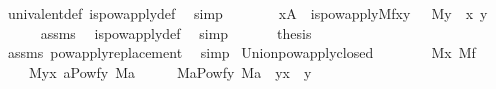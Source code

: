 \begin{isabellebody}
\ univalent{\isacharunderscore}{\kern0pt}def\ is{\isacharunderscore}{\kern0pt}powapply{\isacharunderscore}{\kern0pt}def\ \isamarkupfalse%
\ simp\isanewline
\ \ \isamarkupfalse%
\isanewline
\ \ \isamarkupfalse%
\ {\isachardoublequoteopen}{\isasymlbrakk}\ x{\isasymin}A\ {\isacharsemicolon}{\kern0pt}\ is{\isacharunderscore}{\kern0pt}powapply{\isacharparenleft}{\kern0pt}M{\isacharcomma}{\kern0pt}f{\isacharcomma}{\kern0pt}x{\isacharcomma}{\kern0pt}y{\isacharparenright}{\kern0pt}\ {\isasymrbrakk}\ {\isasymLongrightarrow}\ M{\isacharparenleft}{\kern0pt}y{\isacharparenright}{\kern0pt}{\isachardoublequoteclose}\ \ x\ y\isanewline
\ \ \ \ \isamarkupfalse%
\ assms\ \isamarkupfalse%
\ is{\isacharunderscore}{\kern0pt}powapply{\isacharunderscore}{\kern0pt}def\ \isamarkupfalse%
\ simp\isanewline
\ \ \isamarkupfalse%
\isanewline
\ \ \isamarkupfalse%
\ {\isacharquery}{\kern0pt}thesis\ \isamarkupfalse%
\ assms\ powapply{\isacharunderscore}{\kern0pt}replacement\ \isamarkupfalse%
\ simp\isanewline
{}\isamarkupfalse%
%
\endisatagproof
{\isafoldproof}%
%
\isadelimproof
\isanewline
%
\endisadelimproof
\isanewline
{}\isamarkupfalse%
\ Union{\isacharunderscore}{\kern0pt}powapply{\isacharunderscore}{\kern0pt}closed{\isacharcolon}{\kern0pt}\isanewline
\ \ \ \isanewline
\ \ \ \ {\isachardoublequoteopen}M{\isacharparenleft}{\kern0pt}x{\isacharparenright}{\kern0pt}{\isachardoublequoteclose}\ {\isachardoublequoteopen}M{\isacharparenleft}{\kern0pt}f{\isacharparenright}{\kern0pt}{\isachardoublequoteclose}\isanewline
\ \ \ \isanewline
\ \ \ \ {\isachardoublequoteopen}M{\isacharparenleft}{\kern0pt}{\isasymUnion}y{\isasymin}x{\isachardot}{\kern0pt}\ {\isacharbraceleft}{\kern0pt}a{\isasymin}Pow{\isacharparenleft}{\kern0pt}f{\isacharbackquote}{\kern0pt}y{\isacharparenright}{\kern0pt}{\isachardot}{\kern0pt}\ M{\isacharparenleft}{\kern0pt}a{\isacharparenright}{\kern0pt}{\isacharbraceright}{\kern0pt}{\isacharparenright}{\kern0pt}{\isachardoublequoteclose}\isanewline
%
\isadelimproof
%
\endisadelimproof
%
\isatagproof
{}\isamarkupfalse%
\ {\isacharminus}{\kern0pt}\isanewline
\ \ \isamarkupfalse%
\ {\isachardoublequoteopen}M{\isacharparenleft}{\kern0pt}{\isacharbraceleft}{\kern0pt}a{\isasymin}Pow{\isacharparenleft}{\kern0pt}f{\isacharbackquote}{\kern0pt}y{\isacharparenright}{\kern0pt}{\isachardot}{\kern0pt}\ M{\isacharparenleft}{\kern0pt}a{\isacharparenright}{\kern0pt}{\isacharbraceright}{\kern0pt}{\isacharparenright}{\kern0pt}{\isachardoublequoteclose}\ \ {\isachardoublequoteopen}y{\isasymin}x{\isachardoublequoteclose}\ \ y\isanewline

\end{isabellebody}
